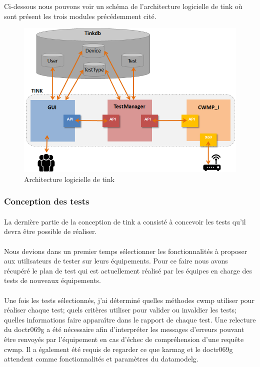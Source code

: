 \documentclass[12pt,a4paper]{report}
\begin{document}
Ci-dessous nous pouvons voir un schéma de l'architecture logicielle de \gls{tink} où sont présent les trois modules précédemment cité.
\begin{figure}[!ht]
    \center
    \includegraphics[scale=0.87]{./img/archi_logi.png}
    \caption{Architecture logicielle de \gls{tink}}
\end{figure}
\newpage

\subsubsection{Conception des tests}
\paragraph*{}La dernière partie de la conception de \gls{tink} a consisté à concevoir les tests qu'il devra être possible de réaliser. 
\paragraph*{}Nous devions dans un premier temps sélectionner les fonctionnalités à proposer aux utilisateurs de tester sur leurs équipements. Pour ce faire nous avons récupéré le plan de test qui est actuellement réalisé par les équipes en charge des tests de nouveaux équipements.   
\paragraph*{}Une fois les tests sélectionnés, j'ai déterminé quelles méthodes \gls{cwmp} utiliser pour réaliser chaque test; quels critères utiliser pour valider ou invaldier les tests; quelles informations faire apparaître dans le rapport de chaque test. Une relecture du \gls{doctr069g} a été nécessaire afin d'interpréter les messages d'erreurs pouvant être renvoyés par l'équipement en cas d'échec de compréhension d'une requête \gls{cwmp}. Il a également été requis de regarder ce que \gls{karmag} et le \gls{doctr069g} attendent comme fonctionnalités et paramètres du \gls{datamodelg}.
\end{document}
